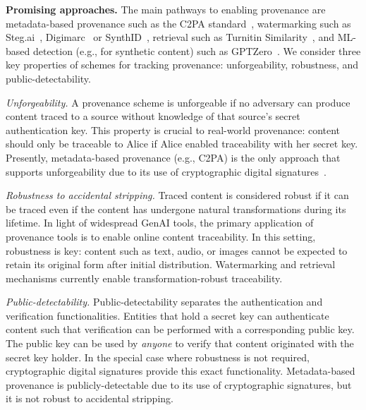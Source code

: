 \documentclass[12pt]{article}
\begin{document}
\textbf{Promising approaches.}
The main pathways to enabling provenance are metadata-based provenance such as the C2PA standard~\citep{c2pa2023coalition}, watermarking such as Steg.ai~\citep{stegai}, Digimarc~\citep{digimarc} or SynthID~\citep{synthid}, retrieval such as Turnitin Similarity~\citep{turnitin}, and ML-based detection (e.g., for synthetic content) such as GPTZero~\citep{gptzero}.
We consider three key properties of schemes for tracking 
provenance: unforgeability, robustness, and public-detectability.

\textit{Unforgeability.}
A provenance scheme is unforgeable if no adversary can produce content traced to a source without knowledge of that source's secret authentication key.
This property is crucial to real-world provenance: content should only be traceable to Alice if Alice enabled traceability with her secret key.
Presently, metadata-based provenance (e.g., C2PA) is the only approach that supports unforgeability due to its use of cryptographic digital signatures~\citep{rivest1978method}.

\textit{Robustness to accidental stripping.} 
Traced content is considered robust if it can be traced even if the content has undergone natural transformations during its lifetime.
In light of widespread GenAI tools, the primary application of provenance tools is to enable online content traceability.
In this setting, robustness is key: content such as text, audio, or images cannot be expected to retain its original form after initial distribution.
Watermarking and retrieval mechanisms currently enable transformation-robust traceability.

\textit{Public-detectability.} 
Public-detectability separates the authentication and verification functionalities.
Entities that hold a secret key can authenticate content such that verification can be performed with a corresponding public key.
The public key can be used by \textit{anyone} to verify that content originated with the secret key holder.
In the special case where robustness is not required, cryptographic digital signatures provide this exact functionality.
Metadata-based provenance is publicly-detectable due to its use of cryptographic signatures, but it is not robust to accidental stripping.
\end{document}
